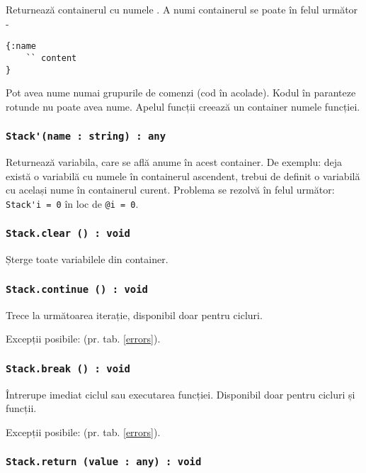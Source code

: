 Returnează containerul cu numele . A numi containerul se poate în felul următor -
\begin{lstlisting}[numbers=none]
{:name
	`` content
}
\end{lstlisting}
Pot avea nume numai grupurile de comenzi (cod în acolade). Kodul în paranteze rotunde nu poate avea nume. Apelul funcții creează un container numele funcției.


\subsubsection{\lstinline|Stack'(name : string) : any|}

Returnează variabila, care se află anume în acest container. De exemplu: deja există o variabilă cu numele  în containerul ascendent, trebui de definit o variabilă cu același nume în containerul curent. Problema se rezolvă în felul următor: \lstinline|Stack'i = 0| în loc de \lstinline|@i = 0|.

\subsubsection{\lstinline|Stack.clear () : void|}

Șterge toate variabilele din container.

\subsubsection{\lstinline|Stack.continue () : void|}

Trece la următoarea iterație, disponibil doar pentru cicluri.

Excepții posibile:  (pr. tab. \ref{errors}).

\subsubsection{\lstinline|Stack.break () : void|}

Întrerupe imediat ciclul sau executarea funcției. Disponibil doar pentru cicluri și funcții.

Excepții posibile:  (pr. tab. \ref{errors}).

\subsubsection{\lstinline|Stack.return (value : any) : void|}

